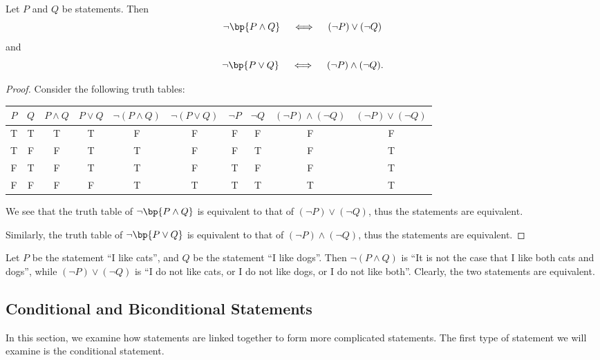 \begin{proposition}
    Let $P$ and $Q$ be statements. Then \[\lnot \bp{P \land Q} \quad \iff \quad (\lnot P) \lor (\lnot Q)\] and \[\lnot \bp{P \lor Q} \quad \iff \quad (\lnot P) \land (\lnot Q).\]
\end{proposition}
\begin{proof}
    Consider the following truth tables:

    \begin{table}[H]
        \centering
        \begin{tabular}{|c|c|c|c|c|c|c|c|c|c|}
        \hline
        $P$ & $Q$ & $P \land Q$ & $P \lor Q$ & $\lnot (P \land Q)$ & $\lnot (P \lor Q)$ & $\lnot P$ & $\lnot Q$ & $(\lnot P) \land (\lnot Q)$ & $(\lnot P) \lor (\lnot Q)$ \\ \hline
        T & T & T & T & F & F & F & F & F & F \\ \hline
        T & F & F & T & T & F & F & T & F & T \\ \hline
        F & T & F & T & T & F & T & F & F & T \\ \hline
        F & F & F & F & T & T & T & T & T & T \\ \hline
        \end{tabular}
    \end{table}

    We see that the truth table of $\lnot \bp{P \land Q}$ is equivalent to that of $(\lnot P) \lor (\lnot Q)$, thus the statements are equivalent.
    
    Similarly, the truth table of $\lnot \bp{P \lor Q}$ is equivalent to that of $(\lnot P) \land (\lnot Q)$, thus the statements are equivalent.
\end{proof}

\begin{example}
    Let $P$ be the statement ``I like cats'', and $Q$ be the statement ``I like dogs''. Then $\lnot (P \land Q)$ is ``It is not the case that I like both cats and dogs'', while $(\lnot P) \lor (\lnot Q)$ is ``I do not like cats, or I do not like dogs, or I do not like both''. Clearly, the two statements are equivalent.
\end{example}

\subsection{Conditional and Biconditional Statements}

In this section, we examine how statements are linked together to form more complicated statements. The first type of statement we will examine is the conditional statement.

